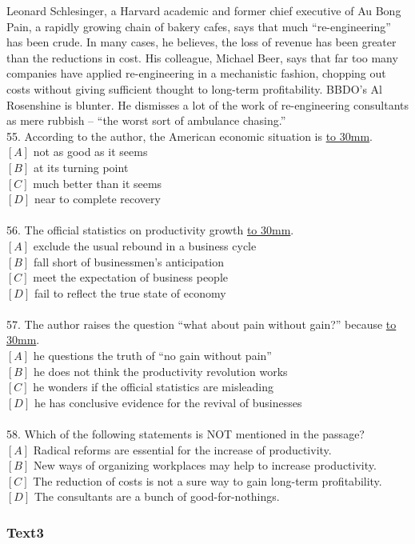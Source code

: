 \documentclass[a4paper]{article}
\begin{document}
\par
Leonard Schlesinger, a Harvard academic and former chief executive of Au Bong Pain, a rapidly growing chain of bakery cafes, says that much “re-engineering” has been crude. In many cases, he believes, the loss of revenue has been greater than the reductions in cost. His colleague, Michael Beer, says that far too many companies have applied re-engineering in a mechanistic fashion, chopping out costs without giving sufficient thought to long-term profitability. BBDO’s Al Rosenshine is blunter. He dismisses a lot of the work of re-engineering consultants as mere rubbish -- “the worst sort of ambulance chasing.”
\\55.	According to the author, the American economic situation is \underline{\hbox to 30mm{}}.\\$[A]$ not as good as it seems\\$[B]$ at its turning point\\$[C]$ much better than it seems\\$[D]$ near to complete recovery\\\\56.	The official statistics on productivity growth \underline{\hbox to 30mm{}}.\\$[A]$ exclude the usual rebound in a business cycle\\$[B]$ fall short of businessmen’s anticipation\\$[C]$ meet the expectation of business people\\$[D]$ fail to reflect the true state of economy\\\\57.	The author raises the question “what about pain without gain?” because \underline{\hbox to 30mm{}}.\\$[A]$ he questions the truth of “no gain without pain”\\$[B]$ he does not think the productivity revolution works\\$[C]$ he wonders if the official statistics are misleading\\$[D]$ he has conclusive evidence for the revival of businesses\\\\58.	Which of the following statements is NOT mentioned in the passage?\\$[A]$ Radical reforms are essential for the increase of productivity.\\$[B]$ New ways of organizing workplaces may help to increase productivity.\\$[C]$ The reduction of costs is not a sure way to gain long-term profitability.\\$[D]$ The consultants are a bunch of good-for-nothings.\\\subsubsection{Text3}
\end{document}
